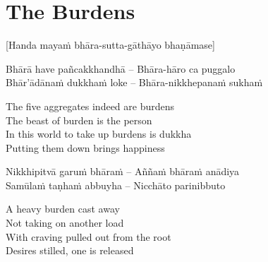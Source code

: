 \suttaRef{[Dhp 85-87.5]}


\section{The Burdens}
\label{burdens}

\begin{center}
  [Handa mayaṁ bhāra-sutta-gāthāyo bhaṇāmase]
\end{center}

\begin{twochants}
  Bhārā have pañcakkhandhā – Bhāra-hāro ca puggalo \\
  Bhār'ādānaṁ dukkhaṁ loke – Bhāra-nikkhepanaṁ sukhaṁ \\
\end{twochants}

\begin{english}
  The five aggregates indeed are burdens\\
  The beast of burden is the person\\
  In this world to take up burdens is dukkha\\
  Putting them down brings happiness
\end{english}

\begin{twochants}
  Nikkhipitvā garuṁ bhāraṁ – Aññaṁ bhāraṁ anādiya\\
  Samūlaṁ taṇhaṁ abbuyha – Nicchāto parinibbuto\\
\end{twochants}

\begin{english}
  A heavy burden cast away\\
  Not taking on another load\\
  With craving pulled out from the root\\
  Desires stilled, one is released
\end{english}

\suttaRef{[SN 22.22]}


